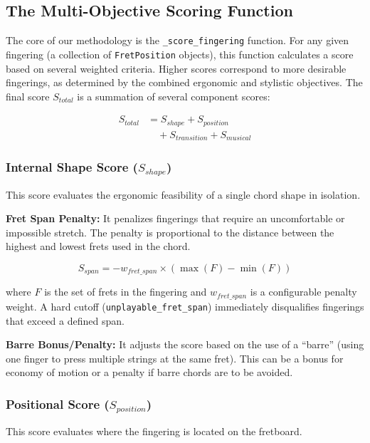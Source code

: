 \documentclass[conference]{IEEEtran}
\begin{document}
\subsection{The Multi-Objective Scoring Function}

The core of our methodology is the \texttt{\_score\_fingering} function. For any given fingering (a collection of \texttt{FretPosition} objects), this function calculates a score based on several weighted criteria. Higher scores correspond to more desirable fingerings, as determined by the combined ergonomic and stylistic objectives. The final score $S_{total}$ is a summation of several component scores:

\begin{align}
S_{total} &= S_{shape} + S_{position} \nonumber\\
          &\quad + S_{transition} + S_{musical}
\end{align}


\subsubsection{Internal Shape Score ($S_{shape}$)}
This score evaluates the ergonomic feasibility of a single chord shape in isolation.

\textbf{Fret Span Penalty:} It penalizes fingerings that require an uncomfortable or impossible stretch. The penalty is proportional to the distance between the highest and lowest frets used in the chord.

\begin{equation}
S_{span} = -w_{fret\_span} \times (\max(F) - \min(F))
\end{equation}

where $F$ is the set of frets in the fingering and $w_{fret\_span}$ is a configurable penalty weight. A hard cutoff (\texttt{unplayable\_fret\_span}) immediately disqualifies fingerings that exceed a defined span.

\textbf{Barre Bonus/Penalty:} It adjusts the score based on the use of a ``barre'' (using one finger to press multiple strings at the same fret). This can be a bonus for economy of motion or a penalty if barre chords are to be avoided.

\subsubsection{Positional Score ($S_{position}$)}
This score evaluates where the fingering is located on the fretboard.
\end{document}
